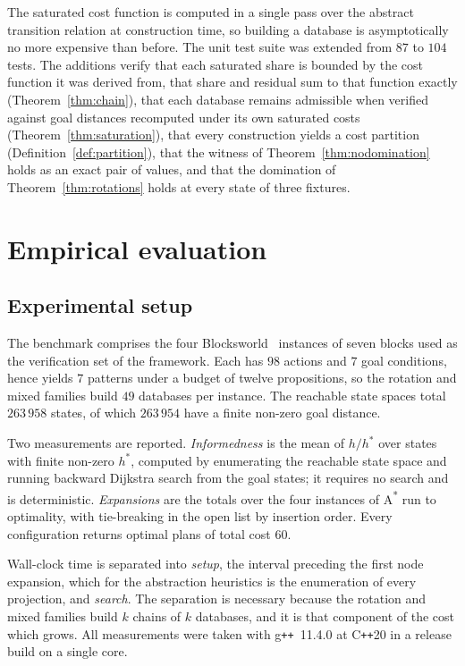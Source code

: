 \documentclass[10pt,twocolumn,a4paper]{article}
\theoremstyle{plain}
\theoremstyle{definition}
\theoremstyle{remark}
\newcommand{\hstar}{h^{*}}
\begin{document}
The saturated cost function is computed in a single pass over the abstract
transition relation at construction time, so building a database is
asymptotically no more expensive than before. The unit test suite was extended
from $87$ to $104$ tests. The additions verify that each saturated share is
bounded by the cost function it was derived from, that share and residual sum
to that function exactly (Theorem~\ref{thm:chain}), that each database remains
admissible when verified against goal distances recomputed under its own
saturated costs (Theorem~\ref{thm:saturation}), that every construction yields
a cost partition (Definition~\ref{def:partition}), that the witness of
Theorem~\ref{thm:nodomination} holds as an exact pair of values, and that the
domination of Theorem~\ref{thm:rotations} holds at every state of three
fixtures.

\section{Empirical evaluation}
\label{sec:evaluation}

\subsection{Experimental setup}

The benchmark comprises the four Blocksworld~\cite{slaney2001} instances of
seven blocks used as the verification set of the framework. Each has $98$
actions and $7$ goal conditions, hence yields $7$ patterns under a budget of
twelve propositions, so the rotation and mixed families build $49$ databases
per instance. The reachable state spaces total $263\,958$ states, of which
$263\,954$ have a finite non-zero goal distance.

Two measurements are reported. \emph{Informedness} is the mean of $h/\hstar$
over states with finite non-zero $\hstar$, computed by enumerating the
reachable state space and running backward Dijkstra search from the goal
states; it requires no search and is deterministic. \emph{Expansions} are the
totals over the four instances of A\textsuperscript{*} run to optimality, with
tie-breaking in the open list by insertion order. Every configuration returns
optimal plans of total cost $60$.

Wall-clock time is separated into \emph{setup}, the interval preceding the first
node expansion, which for the abstraction heuristics is the enumeration of
every projection, and \emph{search}. The separation is necessary because the
rotation and mixed families build $k$ chains of $k$ databases, and it is that
component of the cost which grows. All measurements were taken with
g\texttt{++}~11.4.0 at C\texttt{++}20 in a release build on a single core.
\end{document}

